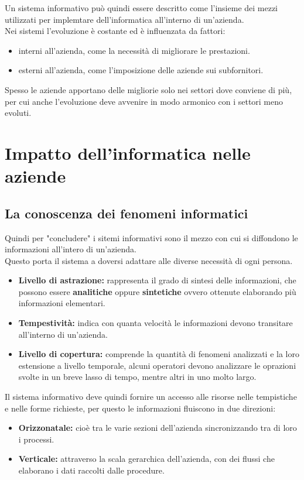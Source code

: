 \documentclass[../main.tex]{subfiles}
\begin{document}
	Un sistema informativo può quindi essere descritto come l'insieme dei mezzi utilizzati per implemtare dell'informatica all'interno di un'azienda.\\
	Nei sistemi l'evoluzione è costante ed è influenzata da fattori:
	\begin{itemize}
		\item interni all'azienda, come la necessità di migliorare le prestazioni.
		\item esterni all'azienda, come l'imposizione delle aziende sui subfornitori.
	\end{itemize}
	Spesso le aziende apportano delle migliorie solo nei settori dove conviene di più, per cui anche l'evoluzione deve avvenire in modo armonico con i settori meno evoluti.

	\section{Impatto dell'informatica nelle aziende}
	\subsection{La conoscenza dei fenomeni informatici}
	Quindi per "concludere" i sitemi informativi sono il mezzo con cui si diffondono le informazioni all'intero di un'azienda.\\
	Questo porta il sistema a doversi adattare alle diverse necessità di ogni persona.
	\begin{itemize}
		\item \textbf{Livello di astrazione:} rappresenta il grado di sintesi delle informazioni, che possono essere \textbf{analitiche} oppure \textbf{sintetiche} ovvero ottenute elaborando più informazioni elementari.
		\item \textbf{Tempestività:} indica con quanta velocità le informazioni devono transitare all'interno di un'azienda.
		\item \textbf{Livello di copertura:} comprende la quantità di fenomeni analizzati e la loro estensione a livello temporale, alcuni operatori devono analizzare le oprazioni svolte in un breve lasso di tempo, mentre altri in uno molto largo. 
	\end{itemize}
	Il sistema informativo deve quindi fornire un accesso alle risorse nelle tempistiche e nelle forme richieste, per questo le informazioni fluiscono in due direzioni:
	\begin{itemize}
		\item \textbf{Orizzonatale:} cioè tra le varie sezioni dell'azienda sincronizzando tra di loro i processi.
		\item \textbf{Verticale:} attraverso la scala gerarchica dell'azienda, con dei flussi che elaborano i dati raccolti dalle procedure.
	\end{itemize}
\end{document}
